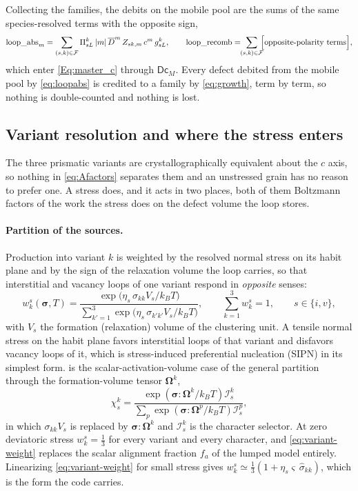 \documentclass{article}
\newcommand{\spvec}[1]{\bm{\mathsf{#1}}}   %
\newcommand{\spmat}[1]{\bm{\mathsf{#1}}}   %
\begin{document}
Collecting the families, the debits on the mobile pool are the sums of the
same species-resolved terms with the opposite sign,
\begin{equation}
  \mathrm{loop\_abs}_m=\sum_{(s,k)\in\mathcal F}
    \Pi^k_{sL}\,|m|\,\overline{D}^m\,Z_{sk,m}\,c^m\,g^k_{sL},
  \qquad
  \mathrm{loop\_recomb}=\!\!\sum_{(s,k)\in\mathcal F}\!\!
    \Bigl[\text{opposite-polarity terms}\Bigr],
  \label{eq:loopabs}
\end{equation}
which enter \cref{Eq:master_c} through $\spmat{D}\spvec{c}_M$. Every defect
debited from the mobile pool by \cref{eq:loopabs} is credited to a family by
\cref{eq:growth}, term by term, so nothing is double-counted and nothing is
lost.

\subsection{Variant resolution and where the stress enters}
\label{sec:stress}

The three prismatic variants are crystallographically equivalent about the $c$
axis, so nothing in \cref{eq:Afactors} separates them and an unstressed grain has
no reason to prefer one. A stress does, and it acts in two places, both of them
Boltzmann factors of the work the stress does on the defect volume the loop
stores.

\paragraph{Partition of the sources.} Production into variant $k$ is weighted by
the resolved normal stress on its habit plane and by the sign of the relaxation
volume the loop carries, so that interstitial and vacancy loops of one variant
respond in \emph{opposite} senses:
\begin{equation}
  w^s_k(\bm\sigma,T)
  =\frac{\exp\!\bigl(\eta_s\,\sigma_{kk}V_s/k_BT\bigr)}
        {\sum_{k'=1}^{3}\exp\!\bigl(\eta_s\,\sigma_{k'k'}V_s/k_BT\bigr)},
  \qquad \sum_{k=1}^{3}w^s_k=1,
  \qquad s\in\{i,v\},
  \label{eq:variant-weight}
\end{equation}
with $V_s$ the formation (relaxation) volume of the clustering unit. A tensile
normal stress on the habit plane favors interstitial loops of that variant and
disfavors vacancy loops of it, which is stress-induced preferential nucleation
(SIPN) in its simplest form.  is the
scalar-activation-volume case of the general partition through the
formation-volume tensor $\bm\Omega^k$,
\begin{equation}
  \chi^k_s=\frac{\exp\!\left(\bm\sigma:\bm\Omega^k/k_BT\right)\mathcal I^k_s}
                {\sum_p\exp\!\left(\bm\sigma:\bm\Omega^p/k_BT\right)\mathcal I^p_s},
  \label{eq:SIPN}
\end{equation}
in which $\sigma_{kk}V_s$ is replaced by $\bm\sigma\!:\!\bm\Omega^k$ and
$\mathcal I^k_s$ is the character selector. At zero deviatoric stress
$w^s_k=\tfrac13$ for every variant and every character, and
\cref{eq:variant-weight} replaces the scalar alignment fraction $f_a$ of the
lumped model entirely. Linearizing \cref{eq:variant-weight} for small stress
gives $w^s_k\simeq\tfrac13(1+\eta_s\varsigma\,\hat\sigma_{kk})$, which is the
form the code carries.
\end{document}
